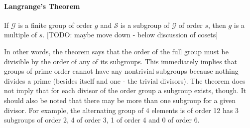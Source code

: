 \paragraph{Langrange's Theorem} If $\mathcal{G}$ is a finite group of order $g$ and $\mathcal{S}$ is a subgroup of  $\mathcal{G}$ of order $s$, then $g$ is a multiple of $s$. [TODO: maybe move down - below discussion of cosets]


\medskip
In other words, the theorem says that the order of the full group must be divisible by the order of any of its subgroups. This immediately implies that groups of prime order cannot have any nontrivial subgroups because nothing divides a prime (besides itself and one - the trivial divisors). The theorem does not imply that for each divisor of the order group a subgroup exists, though. It should also be noted that there may be more than one subgroup for a given divisor. For example, the alternating group of 4 elements is of order 12 has 3 subgroups of order 2, 4 of order 3, 1 of order 4 and 0 of order 6.




